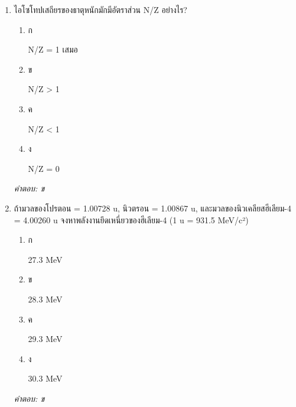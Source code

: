 \documentclass[12pt]{article}
\begin{document}
\begin{enumerate}[label=\arabic*., itemsep=0.5\baselineskip, topsep=0.5\baselineskip, leftmargin=*]
\item ไอโซโทปเสถียรของธาตุหนักมักมีอัตราส่วน N/Z อย่างไร?
\begin{enumerate}[label=\alph*)., itemsep=0.3\baselineskip, topsep=0.3\baselineskip]
\item ก\ 
\begin{minipage}[t]{0.9\linewidth}
\raggedright N/Z = 1 เสมอ
\end{minipage}
\item ข\ 
\begin{minipage}[t]{0.9\linewidth}
\raggedright N/Z > 1
\end{minipage}
\item ค\ 
\begin{minipage}[t]{0.9\linewidth}
\raggedright N/Z < 1
\end{minipage}
\item ง\ 
\begin{minipage}[t]{0.9\linewidth}
\raggedright N/Z = 0
\end{minipage}
\end{enumerate}
\vspace{-0.3\baselineskip}
\begin{small}
\textit{คำตอบ: ข}
\end{small}

\item ถ้ามวลของโปรตอน = 1.00728 u, นิวตรอน = 1.00867 u, และมวลของนิวเคลียสฮีเลียม-4 = 4.00260 u จงหาพลังงานยึดเหนี่ยวของฮีเลียม-4 (1 u = 931.5 MeV/c²)
\begin{enumerate}[label=\alph*)., itemsep=0.3\baselineskip, topsep=0.3\baselineskip]
\item ก\ 
\begin{minipage}[t]{0.9\linewidth}
\raggedright 27.3 MeV
\end{minipage}
\item ข\ 
\begin{minipage}[t]{0.9\linewidth}
\raggedright 28.3 MeV
\end{minipage}
\item ค\ 
\begin{minipage}[t]{0.9\linewidth}
\raggedright 29.3 MeV
\end{minipage}
\item ง\ 
\begin{minipage}[t]{0.9\linewidth}
\raggedright 30.3 MeV
\end{minipage}
\end{enumerate}
\vspace{-0.3\baselineskip}
\begin{small}
\textit{คำตอบ: ข}
\end{small}


\end{enumerate}
\end{document}
